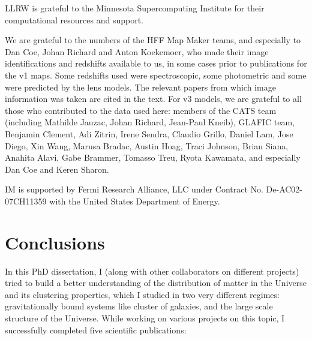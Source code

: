 \documentclass[
  11pt,
  twoside,
  openright,
  titlepage,
  headings=optiontoheadandtoc
]{scrbook}
\begin{document}
LLRW is grateful to the Minnesota Supercomputing Institute for their computational
resources and support.

We are grateful to the numbers of the HFF Map Maker teams, and especially to Dan
Coe, Johan Richard and Anton Koekemoer, who made their image identifications and
redshifts available to us, in some cases prior to publications for the v1 maps. Some
redshifts used were spectroscopic, some photometric and some were predicted by the
lens models. The relevant papers from which image information was taken are cited in
the text.
For v3 models, we are grateful to all those who contributed to the data used here:
members of the CATS team (including Mathilde Jauzac, Johan Richard, Jean-Paul
Kneib), GLAFIC team, Benjamin Clement, Adi Zitrin, Irene Sendra, Claudio Grillo,
Daniel Lam, Jose Diego, Xin Wang, Marusa Bradac, Austin Hoag, Traci Johnson, Brian
Siana, Anahita Alavi, Gabe Brammer, Tomasso Treu, Ryota Kawamata, and especially Dan
Coe and Keren Sharon.
  

IM is supported by Fermi Research Alliance, LLC under Contract No. De-AC02-07CH11359 with the United States Department of Energy.


\chapter{Conclusions}
\label{chap:conclusions}

In this PhD dissertation, I (along with other collaborators on different projects) tried
to build a better understanding of the distribution of 
matter in the Universe and its clustering properties, which I studied
in two very different regimes: gravitationally bound systems like 
cluster of galaxies, and the large scale structure of the Universe. 
While working on various projects on this topic, I successfully
completed five scientific publications:
\end{document}
